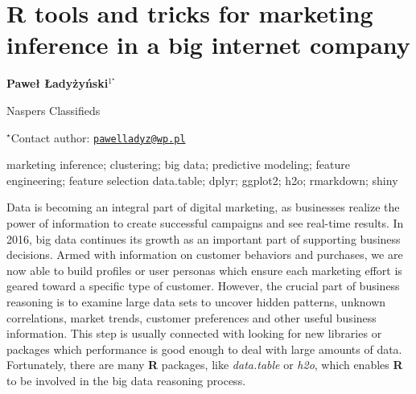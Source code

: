\documentclass[\main/boa.tex]{subfiles}
\begin{document}
\section{R tools and tricks for marketing inference in a big internet company}

\begin{center}
  {\bf {} Paweł Ładyżyński$^{1^\star}$}
\end{center}

\vskip 0.3cm

\begin{affiliations}
\begin{enumerate}
\begin{minipage}{0.915\textwidth}
\centering
\item Naspers Classifieds \\[-2pt]
\end{minipage}
\end{enumerate}
$^\star$Contact author: \href{mailto:pawelladyz@wp.pl}{\nolinkurl{pawelladyz@wp.pl}}\\
\end{affiliations}

\vskip 0.5cm

\begin{minipage}{0.915\textwidth}
\keywords marketing inference; clustering; big data; predictive modeling; feature
engineering; feature selection
\packages {} data.table;  dplyr;  ggplot2;  h2o;  rmarkdown;  shiny
\end{minipage}

\vskip 0.8cm

Data is becoming an integral part of digital marketing, as businesses
realize the power of information to create successful campaigns and see
real-time results. In 2016, big data continues its growth as an
important part of supporting business decisions. Armed with information
on customer behaviors and purchases, we are now able to build profiles
or user personas which ensure each marketing effort is geared toward a
specific type of customer. However, the crucial part of business
reasoning is to examine large data sets to uncover hidden patterns,
unknown correlations, market trends, customer preferences and other
useful business information. This step is usually connected with looking
for new libraries or packages which performance is good enough to deal
with large amounts of data. Fortunately, there are many \textbf{R}
packages, like \emph{data.table} or \emph{h2o}, which enables \textbf{R}
to be involved in the big data reasoning process.
\end{document}
